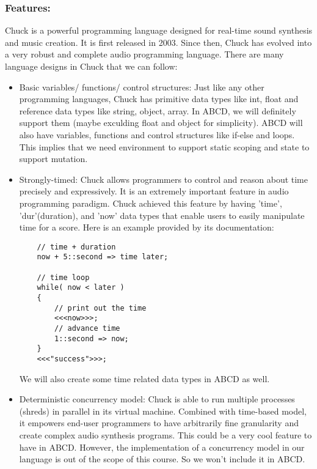     \subsubsection{Features:}
    Chuck is a powerful programming language designed for real-time sound synthesis and music creation\cite{WangCook02}. It is first released in 2003\cite{Wang15}. Since then, Chuck has evolved into a very robust and complete audio programming language. There are many language designs in Chuck that we can follow:
    \begin{itemize}
    \item Basic variables/ functions/ control structures: Just like any other programming languages, Chuck has primitive data types like int, float and reference data types like string, object, array. In ABCD, we will definitely support them (maybe exculding float and object for simplicity). ABCD will also have variables, functions and control structures like if-else and loops. This implies that we need environment to support static scoping and state to support mutation.
    \item Strongly-timed: Chuck allows programmers to control and reason about time precisely and expressively. It is an extremely important feature in audio programming paradigm. Chuck achieved this feature by having 'time', 'dur'(duration), and 'now' data types that enable users to easily manipulate time for a score. Here is an example provided by its documentation:
    \begin{verbatim}
    // time + duration
    now + 5::second => time later;

    // time loop
    while( now < later )
    {
        // print out the time
        <<<now>>>;
        // advance time
        1::second => now;
    }
    <<<"success">>>;
    \end{verbatim}
    We will also create some time related data types in ABCD as well.
    \item Deterministic concurrency model: Chuck is able to run multiple processes (shreds) in parallel in its virtual machine. Combined with time-based model, it empowers end-user programmers to have arbitrarily fine granularity and create complex audio synthesis programs. This could be a very cool feature to have in ABCD. However, the implementation of a concurrency model in our language is out of the scope of this course. So we won't include it in ABCD.
    \end{itemize}

